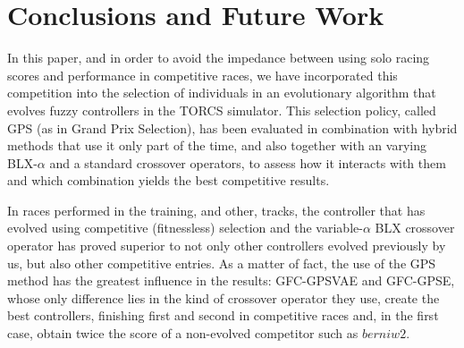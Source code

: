 \documentclass[10pt,journal,compsoc]{IEEEtran}
\begin{document}
\section{Conclusions and Future Work} 
\label{sec:conclusions}

In this paper, and in order to avoid the impedance between using solo
racing scores and performance in competitive races, we have
incorporated this competition into the selection of individuals in an
evolutionary algorithm that evolves fuzzy controllers in the TORCS
simulator. This selection policy, called GPS (as in Grand Prix
Selection), has been evaluated in combination with hybrid methods that
use it only part of the time, and also together with an varying
BLX-$\alpha$ and a standard crossover operators, to assess how it
interacts with them and which combination yields the best competitive
results.


In races performed in the training, and other, tracks, the controller
that has evolved using competitive (fitnessless) selection and the
variable-$\alpha$ BLX crossover operator has proved superior to not
only other controllers evolved previously by us, but also other
competitive entries. As a matter of fact, the use of the GPS method has the greatest
influence in the results: {\sf GFC-GPSVAE} and {\sf GFC-GPSE}, whose only
difference lies in the kind of crossover operator they use, create the
best controllers, finishing first and second in competitive races and,
in the first case, obtain twice the score of a non-evolved
competitor such as $berniw2$.
\end{document}

